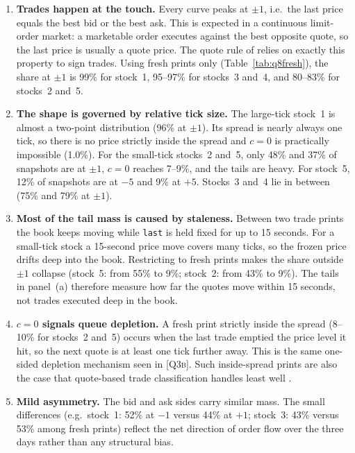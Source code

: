 \documentclass[11pt,a4paper]{article}
\newcommand{\Q}[1]{\textsc{[Q#1]}}
\newcommand{\code}[1]{\texttt{#1}}
\begin{document}
\begin{enumerate}[leftmargin=*,itemsep=2pt]
\item \textbf{Trades happen at the touch.} Every curve peaks at $\pm1$, i.e.\ the last price
equals the best bid or the best ask. This is expected in a continuous limit-order market: a
marketable order executes against the best opposite quote, so the last price is usually a
quote price. The quote rule of \citet{lee1991} relies on exactly this property to sign trades.
Using fresh prints only (Table~\ref{tab:q8fresh}), the share at $\pm1$ is 99\% for stock~1,
95--97\% for stocks~3 and~4, and 80--83\% for stocks~2 and~5.

\item \textbf{The shape is governed by relative tick size.} The large-tick stock~1 is almost a
two-point distribution (96\% at $\pm1$). Its spread is nearly always one tick, so there is no price
strictly inside the spread and $c=0$ is practically impossible (1.0\%). For the small-tick
stocks~2 and~5, only 48\% and 37\% of snapshots are at $\pm1$, $c=0$ reaches 7--9\%, and the
tails are heavy. For stock~5, 12\% of snapshots are at $-5$ and 9\% at $+5$. Stocks~3 and~4 lie in
between (75\% and 79\% at $\pm1$).

\item \textbf{Most of the tail mass is caused by staleness.} Between two trade prints the book
keeps moving while \code{last} is held fixed for up to 15 seconds. For a small-tick stock a
15-second price move covers many ticks, so the frozen price drifts deep into the book. Restricting
to fresh prints makes the share outside $\pm1$ collapse (stock~5: from 55\% to 9\%; stock~2: from
43\% to 9\%). The tails in panel~(a) therefore measure how far the quotes move within 15 seconds,
not trades executed deep in the book.

\item \textbf{$c=0$ signals queue depletion.} A fresh print strictly inside the spread
(8--10\% for stocks~2 and~5) occurs when the last trade emptied the price level it hit, so the
next quote is at least one tick further away. This is the same one-sided depletion mechanism seen
in \Q{3b}. Such inside-spread prints are also the case that quote-based trade classification
handles least well \citep{lee1991}.

\item \textbf{Mild asymmetry.} The bid and ask sides carry similar mass. The small differences
(e.g.\ stock~1: 52\% at $-1$ versus 44\% at $+1$; stock~3: 43\% versus 53\% among fresh prints)
reflect the net direction of order flow over the three days rather than any structural bias.
\end{enumerate}
\end{document}
